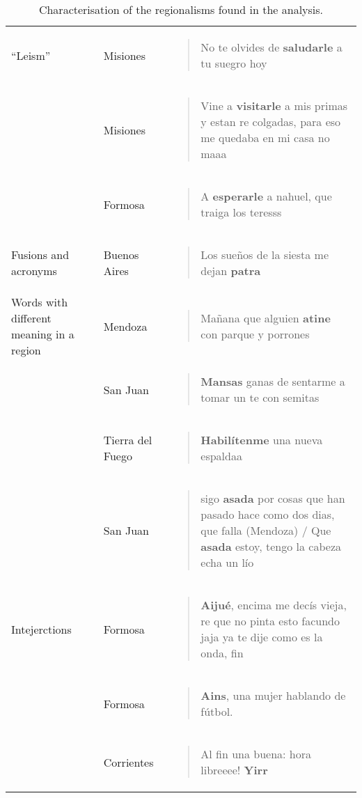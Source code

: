 \begin{table*}[ht!]
\begin{tabular}{p{} p{} p{}}
\hline

``Leism'' & Misiones &  \blockquote{No te olvides de \textbf{saludarle} a tu suegro hoy} \\

& Misiones &   \blockquote{Vine a \textbf{visitarle} a mis primas y estan re colgadas, para eso me quedaba en mi casa no maaa } \\

& Formosa & \blockquote{A \textbf{esperarle} a nahuel, que traiga los teresss } \\

\hline
Fusions and acronyms & Buenos Aires & \blockquote{Los sueños de la siesta me dejan \textbf{patra} }\\


\hline

Words with different meaning in a region & Mendoza &  \blockquote{Mañana que alguien \textbf{atine} con parque y porrones} \\

& San Juan & \blockquote{\textbf{Mansas} ganas de sentarme a tomar un te con semitas} \\

& Tierra del Fuego &  \blockquote{\textbf{Habilítenme} una nueva espaldaa} \\

& San Juan &  \blockquote{sigo \textbf{asada} por cosas que han pasado hace como dos dias, que falla (Mendoza) / Que \textbf{asada} estoy, tengo la cabeza echa un lío} \\


\hline

Intejerctions & Formosa &   \blockquote{\textbf{Aijué}, encima me decís vieja, re que no pinta esto facundo jaja ya te dije como es la onda, fin } \\

& Formosa &  \blockquote{\textbf{Ains}, una mujer hablando de fútbol.} \\

& Corrientes & \blockquote{Al fin una buena: hora libreeee! \textbf{Yirr} } \\
 

\hline 
\end{tabular}
\caption{Characterisation of the regionalisms found in the analysis.  }

\label{tab:characterisation}
\end{table*}


